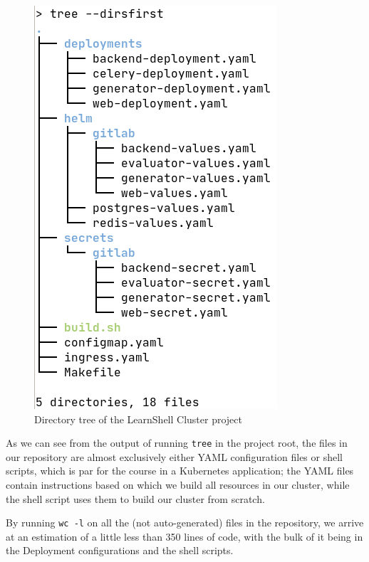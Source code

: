 \documentclass[thesis=B,english]{FITthesis}[2019/12/23]
\begin{document}
\begin{figure}[H]
\caption{Directory tree of the LearnShell Cluster project}
\includegraphics[scale=0.5]{tree}
\end{figure}


As we can see from the output of running \verb|tree| in the project root, the files in our repository are almost exclusively either YAML configuration files or shell scripts, which is par for the course in a Kubernetes application; the YAML files contain instructions based on which we build all resources in our cluster, while the shell script uses them to build our cluster from scratch.


By running \verb|wc -l| on all the (not auto-generated) files in the repository, we arrive at an estimation of a little less than 350 lines of code, with the bulk of it being in the Deployment configurations and the shell scripts.
\end{document}
